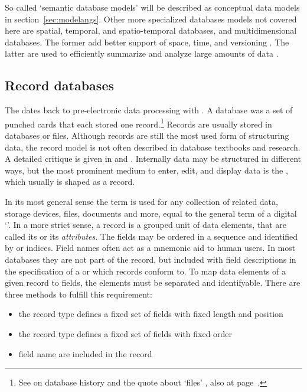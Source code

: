 So called `semantic database models' \cite{Hull1987,Peckham1988} will be 
described as conceptual data models in section~\ref{sec:modelangs}. Other
more specialized databases models not covered here are spatial, temporal,
and spatio-temporal databases, and multidimensional databases. The former add
better support of space, time, and versioning \cite{Chen2001}. The latter are
used to efficiently summarize and analyze large amounts of data
\cite{Vassiliadis1999}.

\subsection{Record databases}
\label{sec:records}
The  dates back to pre-electronic data processing with
. A database was a set of punched cards that each stored one
record.\footnote{See \textcite{McGee1981} on database history and the quote about
`files' \cite[p. 3]{Saltzer1965}, also at page~\pageref{quot:files}.} Records are
usually stored in databases or files. Although records are still the most used
form of structuring data, the record model is not often described in database
textbooks and research. A detailed critique is given in \textcite{Kent1979} and
\textcite[ch. 8]{Kent1978}. Internally data may be structured in different
ways, but the most prominent medium to enter, edit, and display data is the
, which usually is shaped as a record. 

In its most general sense the term  is used for any
collection of related data, storage devices, files, documents and more, equal to
the general term of a digital `'. In a more strict sense, a record
is a grouped unit of data elements, that are called its  or its \textit{attributes}.  The
fields may be ordered in a sequence and identified by  or indices. Field names often act as a mnemonic aid to human users. In
most databases they are not part of the record, but included with field
descriptions in the specification of a  or  which records conform to. To map data elements of a given record to
fields, the elements must be separated and identifyable. There are three
methods to fulfill this requirement:

\begin{itemize}
 \item the record type defines a fixed set of fields with fixed length and
       position
 \item the record type defines a fixed set of fields with fixed order
 \item field name are included in the record
\end{itemize}


